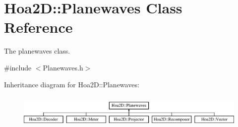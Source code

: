 \hypertarget{class_hoa2_d_1_1_planewaves}{\section{Hoa2\-D\-:\-:Planewaves Class Reference}
\label{class_hoa2_d_1_1_planewaves}
}


The planewaves class.  




{\ttfamily \#include $<$Planewaves.\-h$>$}

Inheritance diagram for Hoa2\-D\-:\-:Planewaves\-:\begin{figure}[H]
\begin{center}
\leavevmode
\includegraphics[height=1.659259cm]{class_hoa2_d_1_1_planewaves}
\end{center}
\end{figure}
